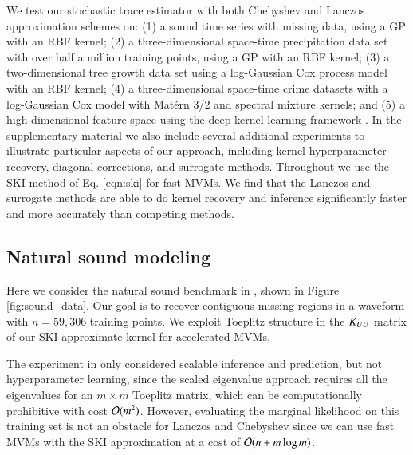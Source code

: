 We test our stochastic trace estimator with both Chebyshev and Lanczos
approximation schemes on:
%
(1) a sound time series with missing data, using a GP with an RBF kernel;
%
(2) a three-dimensional space-time precipitation data set with over half a
million training points, using a GP with an RBF kernel; 
%
(3) a two-dimensional tree growth data set using a log-Gaussian Cox process
model with an RBF kernel;
%
(4) a three-dimensional space-time crime datasets with a log-Gaussian Cox model
with Mat\'ern 3/2 and spectral mixture kernels; and
%
(5) a high-dimensional feature space using the deep kernel learning framework 
\citep{wilson2016deep}. In the supplementary material we also include several
additional experiments to illustrate particular aspects of our approach,
including kernel hyperparameter recovery, diagonal corrections, and surrogate
methods. Throughout we use the SKI method \citep{wilson2015kernel} of Eq. 
\ref{eqn:ski} for fast MVMs. We find that the Lanczos and surrogate methods
are able to do kernel recovery and inference significantly faster and more
accurately than competing methods.

\subsection{Natural sound modeling}\label{sgpsec:sound}
Here we consider the natural sound benchmark in \cite{wilson2015kernel}, shown
in Figure \ref{fig:sound_data}. Our goal is to recover contiguous missing
regions in a waveform with $n = 59,306$ training points. We exploit Toeplitz
structure in the $K_{UU}$ matrix of our SKI approximate kernel for accelerated
MVMs.

The experiment in \cite{wilson2015kernel} only considered scalable inference and
prediction, but not hyperparameter learning, since the scaled eigenvalue
approach requires all the eigenvalues for an $m \times m$ Toeplitz matrix, which
can be computationally prohibitive with cost $\mathcal{O}(m^2)$. However, evaluating
the marginal likelihood on this training set is not an obstacle for Lanczos and
Chebyshev since we can use fast MVMs with the SKI approximation at a cost of
$\mathcal{O}(n + m \log m)$.


